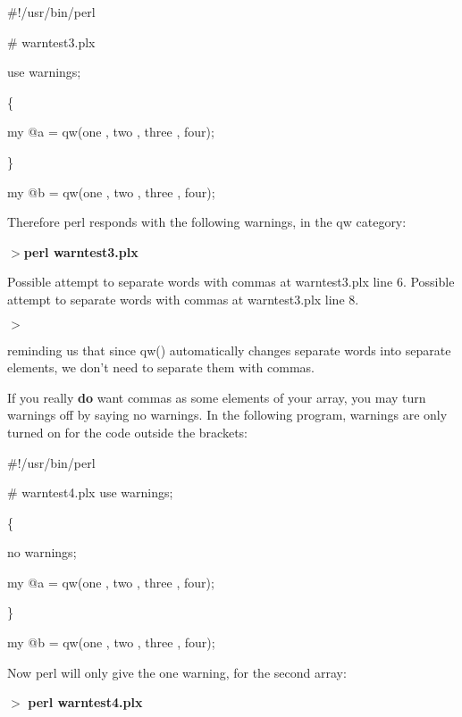 \documentclass[a4paper,11pt]{book}
\begin{document}
\noindent 

\noindent 

\noindent \#!/usr/bin/perl

\noindent \# warntest3.plx

\noindent use warnings;

\noindent 

\noindent \{

\noindent my @a = qw(one , two , three , four);

\noindent \}

\noindent my @b = qw(one , two , three , four);

\noindent 

\noindent Therefore perl responds with the following warnings, in the qw category:

\noindent 

\noindent $>$\textbf{perl warntest3.plx}

\noindent Possible attempt to separate words with commas at warntest3.plx line 6. Possible attempt to separate words with commas at warntest3.plx line 8.

\noindent $>$

\noindent 

\noindent reminding us that since qw() automatically changes separate words into separate elements, we don't need to separate them with commas.

\noindent 

\noindent If you really \textbf{do }want commas as some elements of your array, you may turn warnings off by saying no warnings. In the following program, warnings are only turned on for the code outside the brackets:

\noindent 

\noindent \#!/usr/bin/perl

\noindent \# warntest4.plx use warnings;

\noindent 

\noindent \{

\noindent no warnings;

\noindent my @a = qw(one , two , three , four);

\noindent \}

\noindent my @b = qw(one , two , three , four);

\noindent 

\noindent Now perl will only give the one warning, for the second array:

\noindent 

\noindent $>$ \textbf{perl warntest4.plx}
\end{document}
